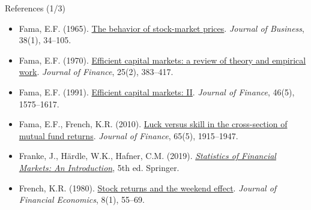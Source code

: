 \begin{frame}{References (1/3)}
\begin{itemize}
    \item Fama, E.F. (1965). \href{https://doi.org/10.1086/294743}{The behavior of stock-market prices}. \textit{Journal of Business}, 38(1), 34--105.
    \item Fama, E.F. (1970). \href{https://doi.org/10.1111/j.1540-6261.1970.tb00518.x}{Efficient capital markets: a review of theory and empirical work}. \textit{Journal of Finance}, 25(2), 383--417.
    \item Fama, E.F. (1991). \href{https://doi.org/10.1111/j.1540-6261.1991.tb04636.x}{Efficient capital markets: II}. \textit{Journal of Finance}, 46(5), 1575--1617.
    \item Fama, E.F., French, K.R. (2010). \href{https://doi.org/10.1111/j.1540-6261.2010.01598.x}{Luck versus skill in the cross-section of mutual fund returns}. \textit{Journal of Finance}, 65(5), 1915--1947.
    \item Franke, J., Härdle, W.K., Hafner, C.M. (2019). \href{https://doi.org/10.1007/978-3-030-13751-9}{\textit{Statistics of Financial Markets: An Introduction}}, 5th ed. Springer.
    \item French, K.R. (1980). \href{https://doi.org/10.1016/0304-405X(80)90021-5}{Stock returns and the weekend effect}. \textit{Journal of Financial Economics}, 8(1), 55--69.
\end{itemize}
\end{frame}

